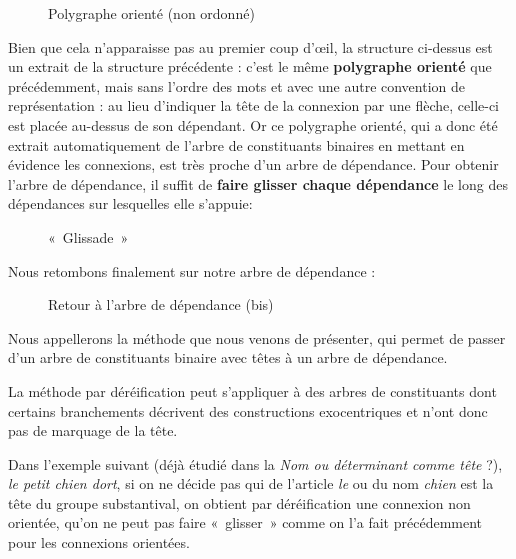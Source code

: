 \begin{figure}

\caption{\label{fig:}Polygraphe orienté (non ordonné)}

\end{figure}

Bien que cela n’apparaisse pas au premier coup d’œil, la structure ci-dessus est un extrait de la structure précédente : c’est le même \textbf{polygraphe orienté} que précédemment, mais sans l’ordre des mots et avec une autre convention de représentation : au lieu d’indiquer la tête de la connexion par une flèche, celle-ci est placée au-dessus de son dépendant. Or ce polygraphe orienté, qui a donc été extrait automatiquement de l’arbre de constituants binaires en mettant en évidence les connexions, est très proche d’un arbre de dépendance. Pour obtenir l’arbre de dépendance, il suffit de \textbf{faire glisser chaque dépendance} le long des dépendances sur lesquelles elle s’appuie:

\begin{figure}

\caption{\label{fig:}«~Glissade~»}

\end{figure}

Nous retombons finalement sur notre arbre de dépendance :

\begin{figure}

\caption{\label{fig:}Retour à l’arbre de dépendance (bis)}

\end{figure}

Nous appellerons la méthode que nous venons de présenter, qui permet de passer d’un arbre de constituants binaire avec têtes à un arbre de dépendance.

La méthode par déréification peut s’appliquer à des arbres de constituants dont certains branchements décrivent des constructions exocentriques et n’ont donc pas de marquage de la tête.

Dans l’exemple suivant (déjà étudié dans la  \textit{Nom ou déterminant comme tête} ?), \textit{le petit chien dort}, si on ne décide pas qui de l’article \textit{le} ou du nom \textit{chien} est la tête du groupe substantival, on obtient par déréification une connexion non orientée, qu’on ne peut pas faire «~glisser~» comme on l’a fait précédemment pour les connexions orientées.

